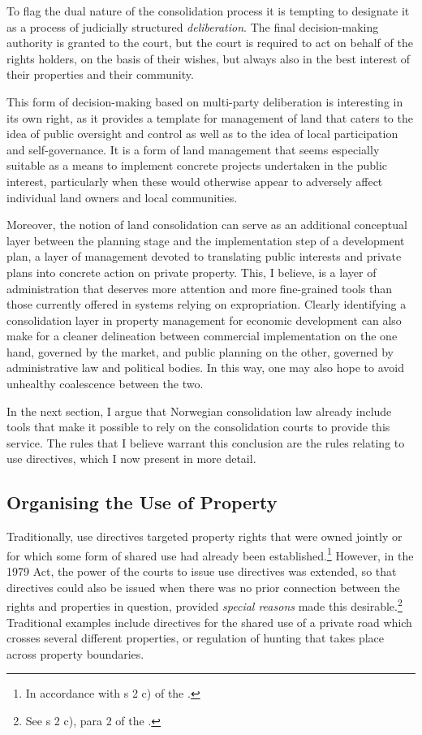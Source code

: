 To flag the dual nature of the consolidation process it is tempting to designate it as a process of judicially structured \emph{deliberation}. The final decision-making authority is granted to the court, but the court is required to act on behalf of the rights holders, on the basis of their wishes, but always also in the best interest of their properties and their community. 

This form of decision-making based on multi-party deliberation is interesting in its own right, as it provides a template for management of land that caters to the idea of public oversight and control as well as to the idea of local participation and self-governance. It is a form of land management that seems especially suitable as a means to implement concrete projects undertaken in the public interest, particularly when these would otherwise appear to adversely affect individual land owners and local communities.

Moreover, the notion of land consolidation can serve as an additional conceptual layer between the planning stage and the implementation step of a development plan, a layer of management devoted to translating public interests and private plans into concrete action on private property. This, I believe, is a layer of administration that deserves more attention and more fine-grained tools than those currently offered in systems relying on expropriation. Clearly identifying a consolidation layer in property management for economic development can also make for a cleaner delineation between commercial implementation on the one hand, governed by the market, and public planning on the other, governed by administrative law and political bodies. In this way, one may also hope to avoid unhealthy coalescence between the two.

In the next section, I argue that Norwegian consolidation law already include tools that make it possible to rely on the consolidation courts to provide this service. The rules that I believe warrant this conclusion are the rules relating to use directives, which I now present in more detail.

\subsection{Organising the Use of Property}\label{sec:3}

Traditionally, use directives targeted property rights that were owned jointly or for which some form of shared use had already been established.\footnote{In accordance with s 2 c) of the \cite{lca79}.} However, in the 1979 Act, the power of the courts to issue use directives was extended, so that directives could also be issued when there was no prior connection between the rights and properties in question, provided \emph{special reasons} made this desirable.\footnote{See s 2 c), para 2 of the \cite{lca79}.} Traditional examples include directives for the shared use of a private road which crosses several different properties, or regulation of hunting that takes place across property boundaries.

